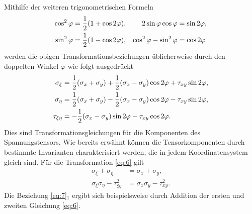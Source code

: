 \documentclass{lecture}
\begin{document}
    Mithilfe der weiteren trigonometrischen Formeln
    \begin{align*}
        \cos^2 \varphi &= \frac{1}{2}\parentheses*{1 + \cos 2\varphi}, & 2\sin\varphi\cos\varphi &= \sin 2\varphi,\\
        \sin^2 \varphi &= \frac{1}{2}\parentheses*{1 - \cos 2\varphi}, & \cos^2 \varphi - \sin^2 \varphi &= \cos 2\varphi
    \end{align*}
    werden die obigen Transformationsbeziehungen üblicherweise durch den doppelten Winkel \(\varphi\) wie folgt ausgedrückt
    \begin{align}\label{eq:6}
        \sigma_\xi &= \frac{1}{2}\parentheses*{\sigma_x + \sigma_y} + \frac{1}{2}\parentheses*{\sigma_x - \sigma_y}\cos 2\varphi + \tau_{xy}\sin 2\varphi,\nonumber\\
        \sigma_\eta &= \frac{1}{2}\parentheses*{\sigma_x + \sigma_y} - \frac{1}{2}\parentheses*{\sigma_x - \sigma_y}\cos 2\varphi - \tau_{xy}\sin 2\varphi,\\
        \tau_{\xi\eta} &= -\frac{1}{2}\parentheses*{\sigma_x - \sigma_y}\sin 2\varphi - \tau_{xy}\cos 2\varphi.\nonumber
    \end{align}
    Dies sind Transformationsgleichungen für die Komponenten des Spannungstensors.
    Wie bereits erwähnt können die Tensorkomponenten durch bestimmte Invarianten charakterisiert werden, die in jedem Koordinatensystem gleich sind.
    Für die Transformation \eqref{eq:6} gilt
    \begin{align}\label{eq:7}
        \sigma_\xi + \sigma_\eta &= \sigma_x + \sigma_y,\nonumber\\
        \sigma_\xi \sigma_\eta - \tau_{\xi\eta}^2 &= \sigma_x \sigma_y - \tau_{xy}^2.
    \end{align}
    Die Beziehung \eqref{eq:7}\({}_1\) ergibt sich beispielsweise durch Addition der ersten und zweiten Gleichung \eqref{eq:6}.
\end{document}
